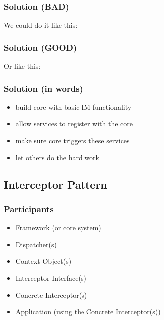 \documentclass{beamer}
\begin{document}
\begin{frame}
  \frametitle{Solution (BAD)}

  We could do it like this:

  \begin{center}
  \end{center}

\end{frame}

\begin{frame}
  \frametitle{Solution (GOOD)}

  Or like this:

  \begin{center}
  \end{center}

\end{frame}

\begin{frame}
  \frametitle{Solution (in words)}

  \begin{itemize}
  \item build core with basic IM functionality
  \item allow services to register with the core
  \item make sure core triggers these services
  \item let others do the hard work
  \end{itemize}

\end{frame}

\subsection{Interceptor Pattern}

\begin{frame}
  \frametitle{Participants}

  \begin{itemize}
  \item Framework (or core system)
  \item Dispatcher(s)
  \item Context Object(s)
  \item Interceptor Interface(s)
  \item Concrete Interceptor(s)
  \item Application (using the Concrete Interceptor(s))
  \end{itemize}

\end{frame}
\end{document}
